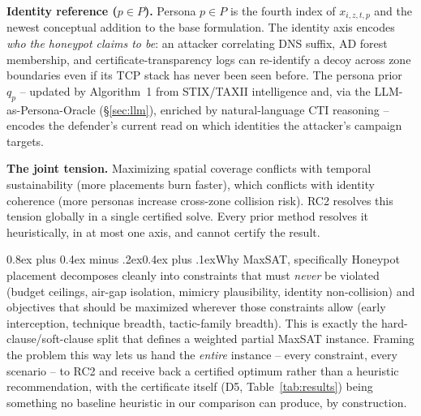 \documentclass[10pt,twocolumn]{article}
\makeatletter
\renewcommand{\subsection}{\@startsection{subsection}{2}{0pt}%
  {0.8ex plus 0.4ex minus .2ex}{0.4ex plus .1ex}{\normalfont\bfseries}}
\makeatother
\begin{document}
\medskip\noindent\textbf{Identity reference ($p\in P$).}\enspace
Persona $p\in P$ is the fourth index of $x_{i,z,t,p}$ and the newest conceptual addition to the base formulation. The identity axis encodes \emph{who the honeypot claims to be}: an attacker correlating DNS suffix, AD forest membership, and certificate-transparency logs can re-identify a decoy across zone boundaries even if its TCP stack has never been seen before. The persona prior $q_p$ -- updated by Algorithm~1 from STIX/TAXII intelligence and, via the LLM-as-Persona-Oracle (\S\ref{sec:llm}), enriched by natural-language CTI reasoning -- encodes the defender's current read on which identities the attacker's campaign targets.

\medskip\noindent\textbf{The joint tension.}\enspace
Maximizing spatial coverage conflicts with temporal sustainability (more placements burn faster), which conflicts with identity coherence (more personas increase cross-zone collision risk). RC2 resolves this tension globally in a single certified solve. Every prior method resolves it heuristically, in at most one axis, and cannot certify the result.

\subsection{Why MaxSAT, specifically}
Honeypot placement decomposes cleanly into constraints that must \emph{never} be violated (budget ceilings, air-gap isolation, mimicry plausibility, identity non-collision) and objectives that should be maximized wherever those constraints allow (early interception, technique breadth, tactic-family breadth). This is exactly the hard-clause/soft-clause split that defines a weighted partial MaxSAT instance. Framing the problem this way lets us hand the \emph{entire} instance -- every constraint, every scenario -- to RC2 and receive back a certified optimum rather than a heuristic recommendation, with the certificate itself (D5, Table~\ref{tab:results}) being something no baseline heuristic in our comparison can produce, by construction.
\end{document}

